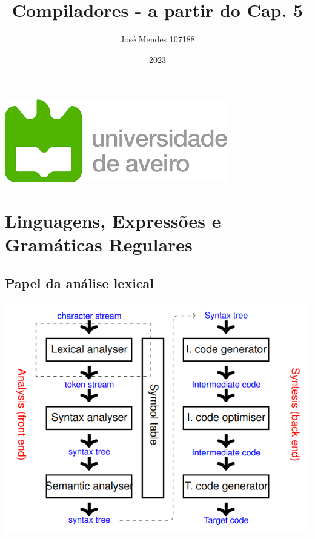 \documentclass{article}
\title{Compiladores - a partir do Cap. 5}
\author{José Mendes 107188}
\date{2023}
\begin{document}
\begin{titlepage}
    \maketitle
    \begin{center}
        \includegraphics[scale=0.4]{UA.png}
    \end{center}
    \thispagestyle{empty} %
\end{titlepage}

\pagebreak

\section{Linguagens, Expressões e Gramáticas Regulares}

\subsection{Papel da análise lexical}

\begin{center}
  \includegraphics[scale=0.4]{1}
\end{center}
\end{document}
